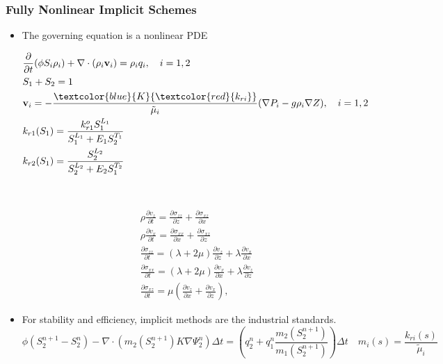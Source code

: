 \documentclass[usenames,dvipsnames]{beamer}
\begin{document}
\begin{frame}
\frametitle{Fully Nonlinear Implicit Schemes}
\begin{itemize}
	\item The governing equation is a nonlinear PDE
\begin{minipage}[b]{0.48\textwidth}
{\scriptsize
	\begin{align*}
	&\frac{\partial }{{\partial t}}(\phi {{S_i}}{\rho _i}) + \nabla  \cdot ({\rho _i}{\mathbf{v}_i}) = {\rho _i}{q_i},\quad 
      i = 1,2	\\
     & S_{1} + S_{2} = 1\\
      &{\mathbf{v}_i} = - \frac{{\textcolor{blue}{K}{\textcolor{red}{k_{ri}}}}}{{{\tilde{\mu}_i}}}(\nabla {P_i} - g{\rho _i}\nabla Z), \quad
      i=1, 2\\
	&k_{r1}(S_1) = \frac{k_{r1}^o S_1^{L_1}}{S_1^{L_1} + E_1 S_2^{T_1}}\\
	&k_{r2}(S_1) = \frac{ S_2^{L_2}}{S_2^{L_2} + E_2 S_1^{T_2}}
	\end{align*}
	}
\end{minipage}~\vline
\begin{minipage}[b]{0.48\textwidth}
\flushleft
	{\scriptsize \begin{eqnarray*}
 && \rho \frac{\partial v_z}{\partial t} = \frac{\partial \sigma_{zz}}{\partial z} + \frac{\partial \sigma_{xz}}{\partial x} \nonumber \\
 && \rho \frac{\partial v_x}{\partial t} = \frac{\partial \sigma_{xx}}{\partial x} + \frac{\partial \sigma_{xz}}{\partial z} \nonumber \\
 && \frac{\partial \sigma_{zz}}{\partial t} = (\lambda + 2\mu)\frac{\partial v_z}{\partial z} + \lambda\frac{\partial v_x}{\partial x} \nonumber \\
 && \frac{\partial \sigma_{xx}}{\partial t} = (\lambda + 2\mu)\frac{\partial v_x}{\partial x} + \lambda\frac{\partial v_z}{\partial z} \nonumber \\
 && \frac{\partial \sigma_{xz}}{\partial t} = \mu (\frac{\partial v_z}{\partial x} + \frac{\partial v_x}{\partial z}),
\end{eqnarray*}}
\end{minipage}

	\item For stability and efficiency, implicit methods are the industrial standards. 
{\scriptsize	$$\phi (S_2^{n + 1} - S_2^n) - \nabla \cdot \left( {{m_{2}}(S_2^{n + 1})K\nabla \Psi _2^n} \right) \Delta t = 
\left(q_2^n + q_1^n \frac{m_2(S^{n+1}_2)}{m_1(S^{n+1}_2)}\right) 
\Delta t\quad m_i(s) = \frac{k_{ri}(s)}{\tilde \mu_i}
$$} 
\end{itemize}

\end{frame}
\end{document}
